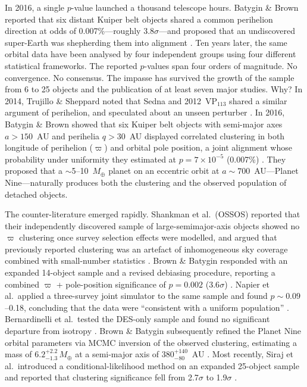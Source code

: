 \documentclass[12pt,a4paper]{article}
\begin{document}
In 2016, a single $p$-value launched a thousand telescope hours. Batygin \& Brown reported that six distant Kuiper belt objects shared a common perihelion direction at odds of 0.007\%---roughly 3.8$\sigma$---and proposed that an undiscovered super-Earth was shepherding them into alignment \cite{batygin2016}. Ten years later, the same orbital data have been analysed by four independent groups using four different statistical frameworks. The reported $p$-values span four orders of magnitude. No convergence. No consensus. The impasse has survived the growth of the sample from 6 to 25 objects and the publication of at least seven major studies. Why? In 2014, Trujillo \& Sheppard noted that Sedna and 2012~VP$_{113}$ shared a similar argument of perihelion, and speculated about an unseen perturber \cite{trujillo2014}. In 2016, Batygin \& Brown showed that six Kuiper belt objects with semi-major axes $a>150$~AU and perihelia $q>30$~AU displayed correlated clustering in both longitude of perihelion ($\varpi$) and orbital pole position, a joint alignment whose probability under uniformity they estimated at $p=7\times10^{-5}$ (0.007\%) \cite{batygin2016}. They proposed that a $\sim$5--10~$M_\oplus$ planet on an eccentric orbit at $a\sim700$~AU---Planet Nine---naturally produces both the clustering and the observed population of detached objects.

The counter-literature emerged rapidly. Shankman et al.\ (OSSOS) reported that their independently discovered sample of large-semimajor-axis objects showed no $\varpi$ clustering once survey selection effects were modelled, and argued that previously reported clustering was an artefact of inhomogeneous sky coverage combined with small-number statistics \cite{shankman2017}. Brown \& Batygin responded with an expanded 14-object sample and a revised debiasing procedure, reporting a combined $\varpi$ + pole-position significance of $p=0.002$ (3.6$\sigma$) \cite{brown2019}. Napier et al.\ applied a three-survey joint simulator to the same sample and found $p\sim0.09$--0.18, concluding that the data were ``consistent with a uniform population'' \cite{napier2021}. Bernardinelli et al.\ tested the DES-only sample and found no significant departure from isotropy \cite{bernardinelli2020}. Brown \& Batygin subsequently refined the Planet Nine orbital parameters via MCMC inversion of the observed clustering, estimating a mass of $6.2^{+2.2}_{-1.3}\,M_\oplus$ at a semi-major axis of $380^{+140}_{-80}$~AU \cite{brown2021}. Most recently, Siraj et al.\ introduced a conditional-likelihood method on an expanded 25-object sample and reported that clustering significance fell from 2.7$\sigma$ to 1.9$\sigma$ \cite{siraj2025,siraj2026}.
\end{document}
